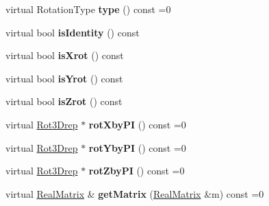 \begin{DoxyCompactItemize}
\item 
\mbox{\label{classRot3Drep_a61eef2f311c1d127fba95558f7a3f0e4}} 
virtual Rotation\+Type {\bfseries type} () const =0
\item 
\mbox{\label{classRot3Drep_ac6af6cc434c763ef47f4bdef97e06954}} 
virtual bool {\bfseries is\+Identity} () const
\item 
\mbox{\label{classRot3Drep_a5ae2e7b3668117e8867da069411d7a5d}} 
virtual bool {\bfseries is\+Xrot} () const
\item 
\mbox{\label{classRot3Drep_a27f5203470ed52429b6104abe305aec4}} 
virtual bool {\bfseries is\+Yrot} () const
\item 
\mbox{\label{classRot3Drep_a70e6fc631acd5013ac357282b1833f41}} 
virtual bool {\bfseries is\+Zrot} () const
\item 
\mbox{\label{classRot3Drep_a9852532cadc4f8baa7910bb61d4ba1e2}} 
virtual \hyperlink{classRot3Drep}{Rot3\+Drep} $\ast$ {\bfseries rot\+Xby\+PI} () const =0
\item 
\mbox{\label{classRot3Drep_a32db771c9536e516036027278861897b}} 
virtual \hyperlink{classRot3Drep}{Rot3\+Drep} $\ast$ {\bfseries rot\+Yby\+PI} () const =0
\item 
\mbox{\label{classRot3Drep_a04101dccb6b9173abee832e14e06353e}} 
virtual \hyperlink{classRot3Drep}{Rot3\+Drep} $\ast$ {\bfseries rot\+Zby\+PI} () const =0
\item 
\mbox{\label{classRot3Drep_aaf24bb524acea63860efb135c922d7f9}} 
virtual \hyperlink{classTLAS_1_1Matrix}{Real\+Matrix} \& {\bfseries get\+Matrix} (\hyperlink{classTLAS_1_1Matrix}{Real\+Matrix} \&m) const =0
\end{DoxyCompactItemize}
